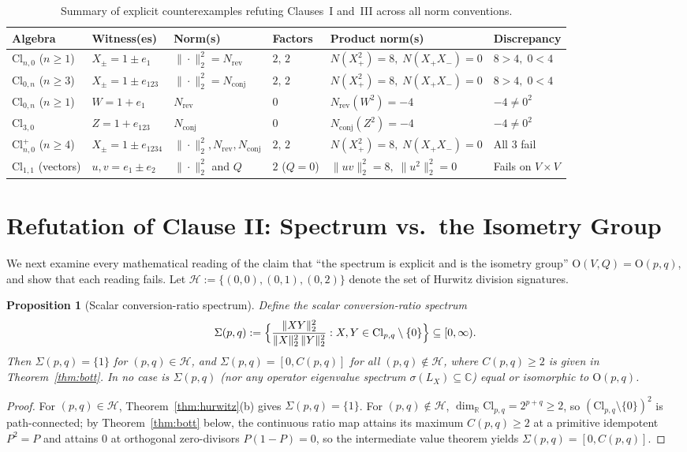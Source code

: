 \documentclass[11pt]{article}
\newtheorem{proposition}[theorem]{Proposition}
\theoremstyle{definition}
\newcommand{\Cl}{\mathrm{Cl}}
\newcommand{\Orth}{\mathrm{O}}
\newcommand{\R}{\mathbb{R}}
\newcommand{\C}{\mathbb{C}}
\newcommand{\Nrev}{N_{\mathrm{rev}}}
\newcommand{\Nconj}{N_{\mathrm{conj}}}
\begin{document}
\begin{table}[htbp]
\centering
\caption{Summary of explicit counterexamples refuting Clauses~I and~III across all norm conventions.}
\label{tab:counterexamples}
\footnotesize
\setlength{\tabcolsep}{4.5pt}
\begin{tabular}{@{}llllll@{}}
\toprule
Algebra & Witness(es) & Norm(s) & Factors & Product norm(s) & Discrepancy \\
\midrule
$\Cl_{n,0}$ ($n\ge 1$) & $X_\pm = 1\pm e_1$ & $\|\cdot\|_2^2 = \Nrev$ & $2,\,2$ & $N(X_+^2)=8,\;N(X_+X_-)=0$ & $8>4,\;0<4$ \\
$\Cl_{0,n}$ ($n\ge 3$) & $X_\pm = 1\pm e_{123}$ & $\|\cdot\|_2^2 = \Nconj$ & $2,\,2$ & $N(X_+^2)=8,\;N(X_+X_-)=0$ & $8>4,\;0<4$ \\
$\Cl_{0,n}$ ($n\ge 1$) & $W = 1+e_1$ & $\Nrev$ & $0$ & $\Nrev(W^2)=-4$ & $-4\ne 0^2$ \\
$\Cl_{3,0}$ & $Z = 1+e_{123}$ & $\Nconj$ & $0$ & $\Nconj(Z^2)=-4$ & $-4\ne 0^2$ \\
$\Cl_{n,0}^+$ ($n\ge 4$) & $X_\pm = 1\pm e_{1234}$ & $\|\cdot\|_2^2,\Nrev,\Nconj$ & $2,\,2$ & $N(X_+^2)=8,\;N(X_+X_-)=0$ & All 3 fail \\
$\Cl_{1,1}$ (vectors) & $u,v = e_1\pm e_2$ & $\|\cdot\|_2^2$ and $Q$ & $2$ ($Q=0$) & $\|uv\|_2^2=8,\;\|u^2\|_2^2=0$ & Fails on $V\times V$ \\
\bottomrule
\end{tabular}
\end{table}

\section{Refutation of Clause II: Spectrum vs.\ the Isometry Group}

We next examine every mathematical reading of the claim that ``the spectrum is explicit and is the isometry group'' $\Orth(V,Q)=\Orth(p,q)$, and show that each reading fails. Let $\mathcal{H}:=\{(0,0),(0,1),(0,2)\}$ denote the set of Hurwitz division signatures.

\begin{proposition}[Scalar conversion-ratio spectrum]\label{prop:ratio-spec}
Define the scalar conversion-ratio spectrum
\[
  \Sigma(p,q) := \Bigl\{\frac{\|XY\|_2^2}{\|X\|_2^2\,\|Y\|_2^2} : X,Y\in\Cl_{p,q}\setminus\{0\}\Bigr\} \subseteq [0,\infty).
\]
Then $\Sigma(p,q)=\{1\}$ for $(p,q)\in\mathcal{H}$, and $\Sigma(p,q)=[0,C(p,q)]$ for all $(p,q)\notin\mathcal{H}$, where $C(p,q)\ge 2$ is given in Theorem~\ref{thm:bott}. In no case is $\Sigma(p,q)$ (nor any operator eigenvalue spectrum $\sigma(L_X)\subseteq\C$) equal or isomorphic to $\Orth(p,q)$.
\end{proposition}
\begin{proof}
For $(p,q)\in\mathcal{H}$, Theorem~\ref{thm:hurwitz}(b) gives $\Sigma(p,q)=\{1\}$. For $(p,q)\notin\mathcal{H}$, $\dim_\R\Cl_{p,q}=2^{p+q}\ge 2$, so $(\Cl_{p,q}\setminus\{0\})^2$ is path-connected; by Theorem~\ref{thm:bott} below, the continuous ratio map attains its maximum $C(p,q)\ge 2$ at a primitive idempotent $P^2=P$ and attains $0$ at orthogonal zero-divisors $P(1-P)=0$, so the intermediate value theorem yields $\Sigma(p,q)=[0,C(p,q)]$.
\end{proof}
\end{document}
